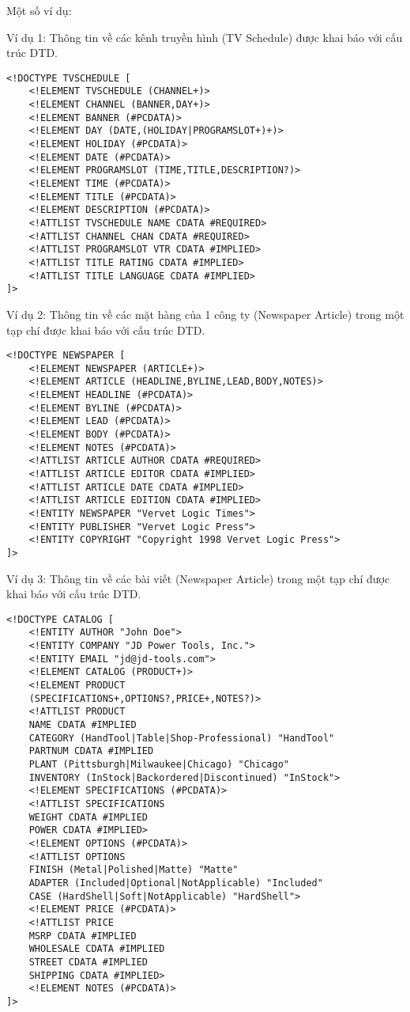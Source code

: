  Một số ví dụ: 
 
 Ví dụ 1: Thông tin về các kênh truyền hình (TV Schedule) được khai báo với cấu trúc DTD. 
\lstset{language=XML}
\begin{lstlisting}
<!DOCTYPE TVSCHEDULE [
	<!ELEMENT TVSCHEDULE (CHANNEL+)>
	<!ELEMENT CHANNEL (BANNER,DAY+)>
	<!ELEMENT BANNER (#PCDATA)>
	<!ELEMENT DAY (DATE,(HOLIDAY|PROGRAMSLOT+)+)>
	<!ELEMENT HOLIDAY (#PCDATA)>
	<!ELEMENT DATE (#PCDATA)>
	<!ELEMENT PROGRAMSLOT (TIME,TITLE,DESCRIPTION?)>
	<!ELEMENT TIME (#PCDATA)>
	<!ELEMENT TITLE (#PCDATA)> 
	<!ELEMENT DESCRIPTION (#PCDATA)>
	<!ATTLIST TVSCHEDULE NAME CDATA #REQUIRED>
	<!ATTLIST CHANNEL CHAN CDATA #REQUIRED>
	<!ATTLIST PROGRAMSLOT VTR CDATA #IMPLIED>
	<!ATTLIST TITLE RATING CDATA #IMPLIED>
	<!ATTLIST TITLE LANGUAGE CDATA #IMPLIED>
]> 
\end{lstlisting}

Ví dụ 2: Thông tin về các mặt hàng của 1 công ty (Newspaper Article) trong một tạp chí được khai báo với cấu trúc DTD.
\lstset{language=XML}
\begin{lstlisting} 
<!DOCTYPE NEWSPAPER [
	<!ELEMENT NEWSPAPER (ARTICLE+)>
	<!ELEMENT ARTICLE (HEADLINE,BYLINE,LEAD,BODY,NOTES)>
	<!ELEMENT HEADLINE (#PCDATA)>
	<!ELEMENT BYLINE (#PCDATA)>
	<!ELEMENT LEAD (#PCDATA)>
	<!ELEMENT BODY (#PCDATA)>
	<!ELEMENT NOTES (#PCDATA)>
	<!ATTLIST ARTICLE AUTHOR CDATA #REQUIRED>
	<!ATTLIST ARTICLE EDITOR CDATA #IMPLIED>
	<!ATTLIST ARTICLE DATE CDATA #IMPLIED>
	<!ATTLIST ARTICLE EDITION CDATA #IMPLIED>
	<!ENTITY NEWSPAPER "Vervet Logic Times">
	<!ENTITY PUBLISHER "Vervet Logic Press">
	<!ENTITY COPYRIGHT "Copyright 1998 Vervet Logic Press">
]>
\end{lstlisting}

Ví dụ 3: Thông tin về các bài viết (Newspaper Article) trong một tạp chí được khai báo với cấu trúc DTD. 
\lstset{language=XML}
\begin{lstlisting}
<!DOCTYPE CATALOG [
	<!ENTITY AUTHOR "John Doe">
	<!ENTITY COMPANY "JD Power Tools, Inc.">
	<!ENTITY EMAIL "jd@jd-tools.com">
	<!ELEMENT CATALOG (PRODUCT+)>
	<!ELEMENT PRODUCT
	(SPECIFICATIONS+,OPTIONS?,PRICE+,NOTES?)>
	<!ATTLIST PRODUCT
	NAME CDATA #IMPLIED
	CATEGORY (HandTool|Table|Shop-Professional) "HandTool"
	PARTNUM CDATA #IMPLIED
	PLANT (Pittsburgh|Milwaukee|Chicago) "Chicago"
	INVENTORY (InStock|Backordered|Discontinued) "InStock">
	<!ELEMENT SPECIFICATIONS (#PCDATA)>
	<!ATTLIST SPECIFICATIONS
	WEIGHT CDATA #IMPLIED
	POWER CDATA #IMPLIED>
	<!ELEMENT OPTIONS (#PCDATA)>
	<!ATTLIST OPTIONS
	FINISH (Metal|Polished|Matte) "Matte"
	ADAPTER (Included|Optional|NotApplicable) "Included"
	CASE (HardShell|Soft|NotApplicable) "HardShell">
	<!ELEMENT PRICE (#PCDATA)>
	<!ATTLIST PRICE
	MSRP CDATA #IMPLIED
	WHOLESALE CDATA #IMPLIED
	STREET CDATA #IMPLIED
	SHIPPING CDATA #IMPLIED>
	<!ELEMENT NOTES (#PCDATA)>
]> 
\end{lstlisting}


